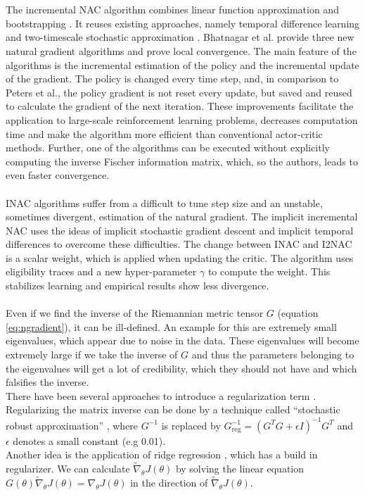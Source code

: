 \\\\
 The incremental NAC algorithm combines linear function approximation and bootstrapping \citep{bhatnagar2008incremental}. It reuses existing approaches, namely temporal difference learning \citep{sutton2018reinforcement} and two-timescale stochastic approximation \citep{bhatnagar1998two}. Bhatnagar et al. provide three new natural gradient algorithms and prove local convergence. The main feature of the algorithms is the incremental estimation of the policy and the incremental update of the gradient. The policy is changed every time step, and, in comparison to Peters et al., the policy gradient is not reset every update, but saved and reused to calculate the gradient of the next iteration. These improvements facilitate the application to large-scale reinforcement learning problems, decreases computation time and make the algorithm more efficient than conventional actor-critic methods. Further, one of the algorithms can be executed without explicitly computing the inverse Fischer information matrix, which, so the authors, leads to even faster convergence.
\\\\
 INAC algorithms suffer from a difficult to tune step size and an unstable, sometimes divergent, estimation of the natural gradient. The implicit incremental NAC \citep{iwaki2019implicit} uses the ideas of implicit stochastic gradient descent \citep{toulis2014statistical} and implicit temporal differences \citep{tamar2014implicit} to overcome these difficulties. The change between INAC and I2NAC is a scalar weight, which is applied when updating the critic. The algorithm uses eligibility traces and a new hyper-parameter $\gamma$ to compute the weight. This stabilizes learning and empirical results show less divergence.
\\\\
 Even if we find the inverse of the Riemannian metric tensor $G$ (equation \ref{eq:ngradient}), it can be ill-defined. An example for this are extremely small eigenvalues, which appear due to noise in the data. These eigenvalues will become extremely large if we take the inverse of $G$ and thus the parameters belonging to the eigenvalues will get a lot of credibility, which they should not have and which falsifies the inverse.
\\
\indent There have been several approaches to introduce a regularization term \cite{sohl2012natural,witsch2011enhancing}. Regularizing the matrix inverse can be done by a technique called ``stochastic robust approximation'' \cite{boyd2004convex}, where $G^{-1}$ is replaced by \(G^{-1}_{\text{reg}} = \left( G^T G + \epsilon I \right)^{-1} G^T\) and $\epsilon$ denotes a small constant (e.g 0.01).
\\
\indent Another idea is the application of ridge regression \cite{hoerl1970ridge}, which has a build in regularizer. We can calculate $\widetilde{\nabla}_{\theta} J(\theta)$ by solving the linear equation \(G(\theta) \widetilde{\nabla}_{\theta} J(\theta) = \nabla_{\theta} J(\theta)\) in the direction of $\widetilde{\nabla}_{\theta} J(\theta)$.

